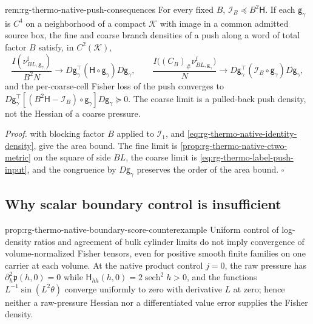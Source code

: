 {rem:rg-thermo-native-push-consequences}
For every fixed $B$, $\mathcal I_B\preceq B^2\mathsf H$. If each
$\mathsf g_\gamma$ is $C^4$ on a neighborhood of a compact $\mathcal K$ with image
in a common admitted source box, the fine and coarse branch densities of a
push along a word of total factor $B$ satisfy, in $C^2(\mathcal K)$,
\[
 \frac{I(\nu^{\mathrm f}_{BL,\mathsf g_\gamma})}{B^2N}
 \longrightarrow D\mathsf g_\gamma^\top(\mathsf H\circ\mathsf g_\gamma)D\mathsf g_\gamma,
 \qquad
 \frac{I\bigl((C_B)_\#\nu^{\mathrm f}_{BL,\mathsf g_\gamma}\bigr)}{N}
 \longrightarrow
 D\mathsf g_\gamma^\top(\mathcal I_B\circ\mathsf g_\gamma)D\mathsf g_\gamma,
\]
and the per-coarse-cell Fisher loss of the push converges to
$D\mathsf g_\gamma^\top[(B^2\mathsf H-\mathcal I_B)\circ\mathsf g_\gamma]D\mathsf g_\gamma\succeq0$.
The coarse limit is a pulled-back push density, not the Hessian of a coarse
pressure. 

\noindent\emph{Proof.}
 with blocking factor $B$ applied to
$\mathcal I_1$, and \cref{eq:rg-thermo-native-identity-density}, give the
area bound. The fine limit is \cref{prop:rg-thermo-native-ctwo-metric} on the
square of side $BL$, the coarse limit is
\cref{eq:rg-thermo-label-push-input}, and the congruence by
$D\mathsf g_\gamma$ preserves the order of the area bound. $\square$

\subsection{Why scalar boundary control is insufficient}
\label{sec:rg-thermo-native-boundary-obstruction}

{prop:rg-thermo-native-boundary-score-counterexample}
Uniform control of log-density ratios and agreement of bulk cylinder limits
do not imply convergence of volume-normalized Fisher tensors, even for
positive smooth finite families on one carrier at each volume. At the native
product control $j=0$, the raw pressure has
$\partial_h^2\mathfrak p(h,0)=0$ while $\mathsf H_{hh}(h,0)=2\operatorname{sech}^2h>0$,
and the functions $L^{-1}\sin(L^2\theta)$ converge uniformly to zero with
derivative $L$ at zero; hence neither a raw-pressure Hessian nor a
differentiated value error supplies the Fisher density. 

